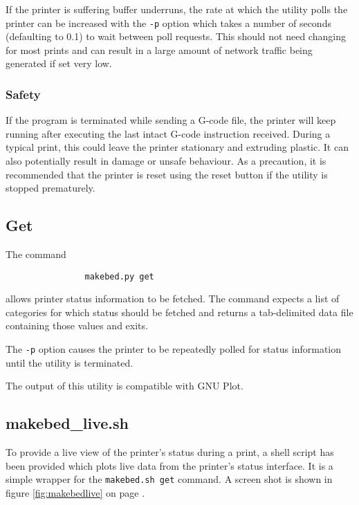 			If the printer is suffering buffer underruns, the rate at which the
			utility polls the printer can be increased with the \verb|-p| option which
			takes a number of seconds (defaulting to 0.1) to wait between poll
			requests. This should not need changing for most prints and can result in
			a large amount of network traffic being generated if set very low.
			
			\subsubsection{Safety}
				
				If the program is terminated while sending a G-code file, the printer
				will keep running after executing the last intact G-code instruction
				received. During a typical print, this could leave the printer
				stationary and extruding plastic. It can also potentially result in
				damage or unsafe behaviour. As a precaution, it is recommended that the
				printer is reset using the reset button if the utility is stopped
				prematurely.
		
		\subsection{Get}
			
			The command
			\begin{verbatim}
				makebed.py get
			\end{verbatim}
			allows printer status information to be fetched. The command expects a
			list of categories for which status should be fetched and returns a
			tab-delimited data file containing those values and exits.
			
			The \verb|-p| option causes the printer to be repeatedly polled for status
			information until the utility is terminated.
			
			The output of this utility is compatible with GNU Plot.
		
		\subsection{makebed\_live.sh}
			
			\label{sec:makebedliveDoc}
			
			To provide a live view of the printer's status during a print, a shell
			script has been provided which plots live data from the printer's status
			interface. It is a simple wrapper for the \verb|makebed.sh get| command. A
			screen shot is shown in figure \ref{fig:makebedlive} on page
			\pageref{fig:makebedlive}.
